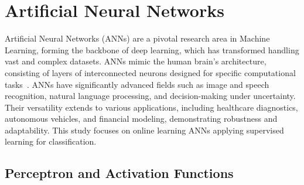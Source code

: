 \section{Artificial Neural Networks}


Artificial Neural Networks (ANNs) are a pivotal research area in Machine Learning, forming the backbone of deep learning, which has transformed handling
vast and complex datasets. ANNs mimic the human brain's architecture, consisting of layers of interconnected neurons designed for specific computational
tasks~\cite{dongare_intro_ANN_2012}. ANNs have significantly advanced fields such as image and speech recognition, natural language processing, and
decision-making under uncertainty. Their versatility extends to various applications, including healthcare diagnostics, autonomous vehicles, and financial
modeling, demonstrating robustness and adaptability\cite{wu_feng_ANN_development_2018}. This study focuses on online learning ANNs applying supervised learning
for classification.

\subsection{Perceptron and Activation Functions}
